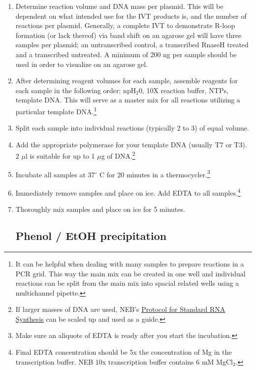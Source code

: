 \documentclass[12pt]{article}
\theoremstyle{definition}
\begin{document}
\begin{enumerate}

\item Determine reaction volume and DNA mass per plasmid. This will be dependent on
what intended use for the IVT products is, and the number of reactions per plasmid. Generally, a complete IVT to demonstrate R-loop formation (or lack thereof) via band shift on an agarose gel will have three samples per plasmid; an untranscribed control, a transcribed RnaseH treated and a transcribed untreated. A minimum of 200 ng per sample should be used in order to visualize on an agarose gel.

\item After determining reagent volumes for each sample, assemble reagents for each sample in the following order; npH$_{2}$0, 10X reaction buffer, NTPs, template DNA. This will serve as a master mix for all reactions utilizing a particular template DNA.\footnote{It can be helpful when dealing with many samples to prepare reactions in a PCR grid. This way the main mix can be created in one well and individual reactions can be split from the main mix into spacial related wells using a multichannel pipette.}

\item Split each sample into individual reactions (typically 2 to 3) of equal volume.

\item Add the appropriate polymerase for your template DNA (usually T7 or T3). 2 $\mu$l is suitable for up to 1 $\mu$g of DNA.\footnote{If larger masses of DNA are used, NEB's \href{https://www.neb.com/protocols/2015/03/09/protocol-for-standard-rna-synthesis}{Protocol for Standard RNA Synthesis} can be scaled up and used as a guide.}

\item Incubate all samples at 37$^{\circ}$ C for 20 minutes in a thermocycler.\footnote{Make sure an aliquote of EDTA is ready after you start the incubation.}

\item Immediately remove samples and place on ice. Add EDTA to all samples.\footnote{Final EDTA concentration should be 5x the concentration of Mg in the transcription buffer. NEB 10x transcription buffer contains 6 mM MgCl$_{2}$.}

\item Thoroughly mix samples and place on ice for 5 minutes.

\subsection*{Phenol / EtOH precipitation}


\end{enumerate}
\end{document}
